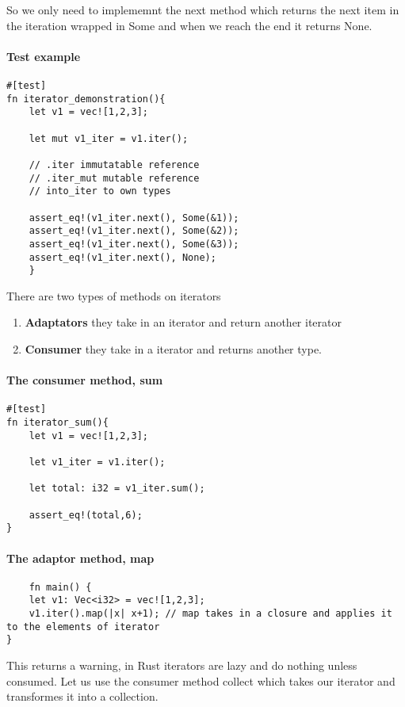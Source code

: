 So we only need to implememnt the next method which returns the next item in the iteration wrapped in Some and when we reach the end it returns None.

\paragraph*{Test example}\begin{lstlisting}
#[test]
fn iterator_demonstration(){
    let v1 = vec![1,2,3];
    
    let mut v1_iter = v1.iter();
    
    // .iter immutatable reference
    // .iter_mut mutable reference
    // into_iter to own types
    
    assert_eq!(v1_iter.next(), Some(&1));
    assert_eq!(v1_iter.next(), Some(&2));
    assert_eq!(v1_iter.next(), Some(&3));
    assert_eq!(v1_iter.next(), None);
    }
\end{lstlisting}


\begin{definition}
    There are two types of methods on iterators\begin{enumerate}
        \item \textbf{Adaptators} they take in an iterator and return another iterator
        \item \textbf{Consumer} they take in a iterator and returns another type.  
    \end{enumerate}
\end{definition}


\paragraph*{The consumer method, sum}\begin{lstlisting}
#[test]
fn iterator_sum(){
    let v1 = vec![1,2,3];

    let v1_iter = v1.iter();

    let total: i32 = v1_iter.sum();

    assert_eq!(total,6);
}
\end{lstlisting}

\paragraph*{The adaptor method, map}\begin{lstlisting}
    fn main() {
    let v1: Vec<i32> = vec![1,2,3];
    v1.iter().map(|x| x+1); // map takes in a closure and applies it to the elements of iterator
}
\end{lstlisting}
This returns a warning, in Rust iterators are lazy and do nothing unless consumed. Let us use the consumer method collect which takes our iterator and transformes it into a collection. 


